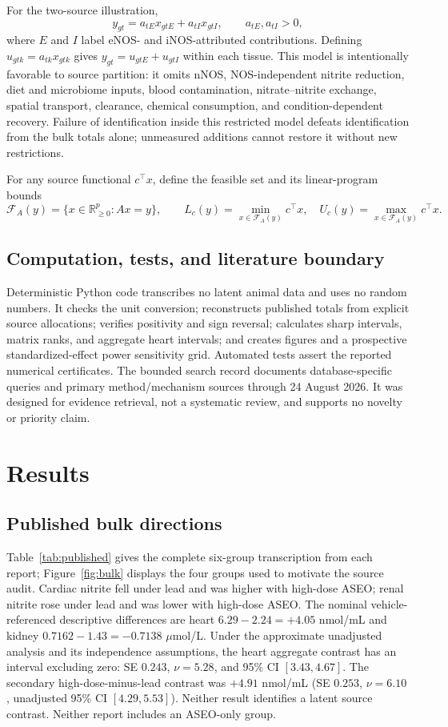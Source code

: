 \documentclass[11pt]{article}
\newcommand{\Rplus}{\mathbb{R}_{\geq 0}}
\begin{document}
For the two-source illustration,
\[
y_{gt}=a_{tE} x_{gtE}+a_{tI} x_{gtI},\qquad a_{tE},a_{tI}>0,
\]
where $E$ and $I$ label eNOS- and iNOS-attributed contributions. Defining $u_{gtk}=a_{tk}x_{gtk}$ gives $y_{gt}=u_{gtE}+u_{gtI}$ within each tissue. This model is intentionally favorable to source partition: it omits nNOS, NOS-independent nitrite reduction, diet and microbiome inputs, blood contamination, nitrate--nitrite exchange, spatial transport, clearance, chemical consumption, and condition-dependent recovery. Failure of identification inside this restricted model defeats identification from the bulk totals alone; unmeasured additions cannot restore it without new restrictions.

For any source functional $c^\top x$, define the feasible set and its linear-program bounds \citep{boydvandenberghe2004}
\[
\mathcal F_A(y)=\{x\in\Rplus^p:Ax=y\},\qquad
L_c(y)=\min_{x\in\mathcal F_A(y)}c^\top x,\quad
U_c(y)=\max_{x\in\mathcal F_A(y)}c^\top x.
\]

\subsection{Computation, tests, and literature boundary}

Deterministic Python code transcribes no latent animal data and uses no random numbers. It checks the unit conversion; reconstructs published totals from explicit source allocations; verifies positivity and sign reversal; calculates sharp intervals, matrix ranks, and aggregate heart intervals; and creates figures and a prospective standardized-effect power sensitivity grid. Automated tests assert the reported numerical certificates. The bounded search record documents database-specific queries and primary method/mechanism sources through 24 August 2026. It was designed for evidence retrieval, not a systematic review, and supports no novelty or priority claim.

\section{Results}

\subsection{Published bulk directions}

Table~\ref{tab:published} gives the complete six-group transcription from each report; Figure~\ref{fig:bulk} displays the four groups used to motivate the source audit. Cardiac nitrite fell under lead and was higher with high-dose ASEO; renal nitrite rose under lead and was lower with high-dose ASEO. The nominal vehicle-referenced descriptive differences are heart $6.29-2.24=+4.05$ nmol/mL and kidney $0.7162-1.43=-0.7138$ $\mu$mol/L. Under the approximate unadjusted analysis and its independence assumptions, the heart aggregate contrast has an interval excluding zero: SE $0.243$, $\nu=5.28$, and 95\% CI $[3.43,4.67]$. The secondary high-dose-minus-lead contrast was $+4.91$ nmol/mL (SE $0.253$, $\nu=6.10$, unadjusted 95\% CI $[4.29,5.53]$). Neither result identifies a latent source contrast. Neither report includes an ASEO-only group.
\end{document}
